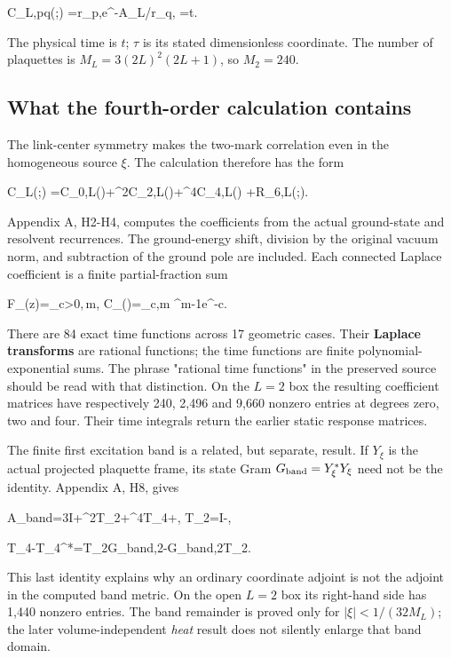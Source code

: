 \documentclass[11pt,a4paper]{article}
\renewcommand{\[}{\begingroup\small\originaldisplaystart}
\renewcommand{\]}{\originaldisplayend\endgroup}
\begin{document}
\[
\widehat C_{L,pq}(\tau;\xi)
=\langle r_p,e^{-\tau A_L/\kappa}r_q\rangle,
\qquad \tau=\kappa t.
\]

The physical time is \(t\); \(\tau\) is its stated dimensionless
coordinate. The number of plaquettes is \(M_L=3(2L)^2(2L+1)\), so
\(M_2=240\).

\subsection{What the fourth-order calculation
contains}\label{what-the-fourth-order-calculation-contains}

The link-center symmetry makes the two-mark correlation even in the
homogeneous source \(\xi\). The calculation therefore has the form

\[
\widehat C_L(\tau;\xi)
=C_{0,L}(\tau)+\xi^2C_{2,L}(\tau)+\xi^4C_{4,L}(\tau)
+\mathcal R_{6,L}(\tau;\xi).
\]

Appendix A, H2-H4, computes the coefficients from the actual
ground-state and resolvent recurrences. The ground-energy shift,
division by the original vacuum norm, and subtraction of the ground pole
are included. Each connected Laplace coefficient is a finite
partial-fraction sum

\[
F_\nu(z)=\sum_{c>0,\,m},
\qquad
C_\nu(\tau)=\sum_{c,m}
\tau^{m-1}e^{-c\tau}.
\]

There are 84 exact time functions across 17 geometric cases. Their
\textbf{Laplace transforms} are rational functions; the time functions
are finite polynomial-exponential sums. The phrase "rational time
functions" in the preserved source should be read with that distinction.
On the \(L=2\) box the resulting coefficient matrices have respectively
240, 2,496 and 9,660 nonzero entries at degrees zero, two and four.
Their time integrals return the earlier static response matrices.

The finite first excitation band is a related, but separate, result. If
\(Y_\xi\) is the actual projected plaquette frame, its state Gram
\(G_{\rm band}=Y_\xi^*Y_\xi\) need not be the identity. Appendix A, H8,
gives

\[
A_{\rm band}=3I+\xi^2T_2+\xi^4T_4+\cdots,
\qquad T_2=I-,
\]

\[
T_4-T_4^*=T_2G_{{\rm band},2}-G_{{\rm band},2}T_2.
\]

This last identity explains why an ordinary coordinate adjoint is not
the adjoint in the computed band metric. On the open \(L=2\) box its
right-hand side has 1,440 nonzero entries. The band remainder is proved
only for \(|\xi|<1/(32M_L)\); the later volume-independent \emph{heat}
result does not silently enlarge that band domain.
\end{document}

